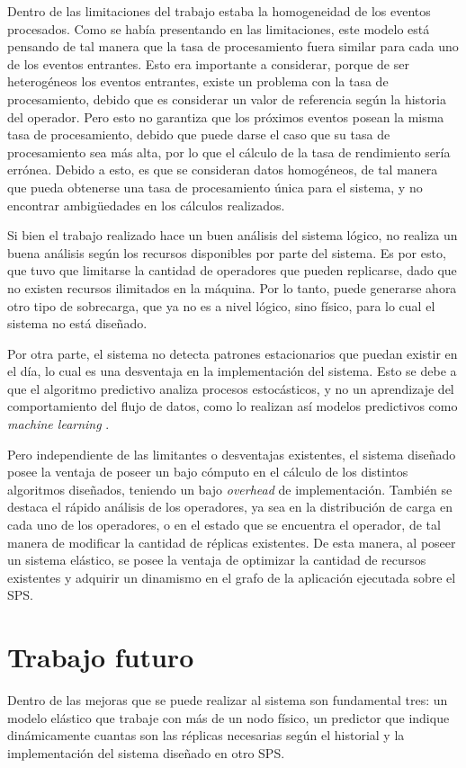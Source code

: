 Dentro de las limitaciones del trabajo estaba la homogeneidad de los eventos procesados. Como se había presentando en las limitaciones, este modelo está pensando de tal manera que la tasa de procesamiento fuera similar para cada uno de los eventos entrantes. Esto era importante a considerar, porque de ser heterogéneos los eventos entrantes, existe un problema con la tasa de procesamiento, debido que es considerar un valor de referencia según la historia del operador. Pero esto no garantiza que los próximos eventos posean la misma tasa de procesamiento, debido que puede darse el caso que su tasa de procesamiento sea más alta, por lo que el cálculo de la tasa de rendimiento sería errónea. Debido a esto, es que se consideran datos homogéneos, de tal manera que pueda obtenerse una tasa de procesamiento única para el sistema, y no encontrar ambigüedades en los cálculos realizados.

Si bien el trabajo realizado hace un buen análisis del sistema lógico, no realiza un buena análisis según los recursos disponibles por parte del sistema. Es por esto, que tuvo que limitarse la cantidad de operadores que pueden replicarse, dado que no existen recursos ilimitados en la máquina. Por lo tanto, puede generarse ahora otro tipo de sobrecarga, que ya no es a nivel lógico, sino físico, para lo cual el sistema no está diseñado.

Por otra parte, el sistema no detecta patrones estacionarios que puedan existir en el día, lo cual es una desventaja en la implementación del sistema. Esto se debe a que el algoritmo predictivo analiza procesos estocásticos, y no un aprendizaje del comportamiento del flujo de datos, como lo realizan así modelos predictivos como \textit{machine learning} \citep{bookMohri2012}.

Pero independiente de las limitantes o desventajas existentes, el sistema diseñado posee la ventaja de poseer un bajo cómputo en el cálculo de los distintos algoritmos diseñados, teniendo un bajo \textit{overhead} de implementación. También se destaca el rápido análisis de los operadores, ya sea en la distribución de carga en cada uno de los operadores, o en el estado que se encuentra el operador, de tal manera de modificar la cantidad de réplicas existentes. De esta manera, al poseer un sistema elástico, se posee la ventaja de optimizar la cantidad de recursos existentes y adquirir un dinamismo en el grafo de la aplicación ejecutada sobre el SPS.

\section{Trabajo futuro}
Dentro de las mejoras que se puede realizar al sistema son fundamental tres: un modelo elástico que trabaje con más de un nodo físico, un predictor que indique dinámicamente cuantas son las réplicas necesarias según el historial y la implementación del sistema diseñado en otro SPS.

